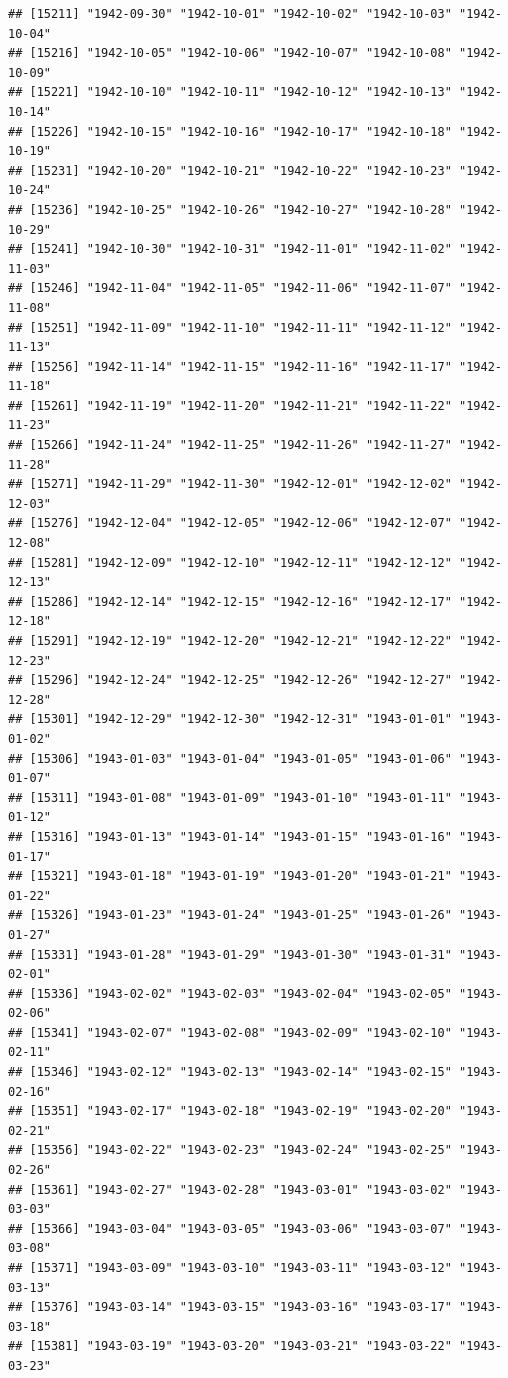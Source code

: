 \documentclass{article}\usepackage[]{graphicx}\usepackage[]{color}
\makeatletter
\newenvironment{kframe}{%
 \def\at@end@of@kframe{}%
 \ifinner\ifhmode%
  \def\at@end@of@kframe{\end{minipage}}%
  \begin{minipage}{\columnwidth}%
 \fi\fi%
 \def\FrameCommand##1{\hskip\@totalleftmargin \hskip-\fboxsep
 \colorbox{shadecolor}{##1}\hskip-\fboxsep
     \hskip-\linewidth \hskip-\@totalleftmargin \hskip\columnwidth}%
 \MakeFramed {\advance\hsize-\width
   \@totalleftmargin\z@ \linewidth\hsize
   \@setminipage}}%
 {\par\unskip\endMakeFramed%
 \at@end@of@kframe}
\newenvironment{knitrout}{}{} %
\makeatother
\begin{document}
\begin{description}
\begin{knitrout}
\begin{kframe}
\begin{verbatim}
## [15211] "1942-09-30" "1942-10-01" "1942-10-02" "1942-10-03" "1942-10-04"
## [15216] "1942-10-05" "1942-10-06" "1942-10-07" "1942-10-08" "1942-10-09"
## [15221] "1942-10-10" "1942-10-11" "1942-10-12" "1942-10-13" "1942-10-14"
## [15226] "1942-10-15" "1942-10-16" "1942-10-17" "1942-10-18" "1942-10-19"
## [15231] "1942-10-20" "1942-10-21" "1942-10-22" "1942-10-23" "1942-10-24"
## [15236] "1942-10-25" "1942-10-26" "1942-10-27" "1942-10-28" "1942-10-29"
## [15241] "1942-10-30" "1942-10-31" "1942-11-01" "1942-11-02" "1942-11-03"
## [15246] "1942-11-04" "1942-11-05" "1942-11-06" "1942-11-07" "1942-11-08"
## [15251] "1942-11-09" "1942-11-10" "1942-11-11" "1942-11-12" "1942-11-13"
## [15256] "1942-11-14" "1942-11-15" "1942-11-16" "1942-11-17" "1942-11-18"
## [15261] "1942-11-19" "1942-11-20" "1942-11-21" "1942-11-22" "1942-11-23"
## [15266] "1942-11-24" "1942-11-25" "1942-11-26" "1942-11-27" "1942-11-28"
## [15271] "1942-11-29" "1942-11-30" "1942-12-01" "1942-12-02" "1942-12-03"
## [15276] "1942-12-04" "1942-12-05" "1942-12-06" "1942-12-07" "1942-12-08"
## [15281] "1942-12-09" "1942-12-10" "1942-12-11" "1942-12-12" "1942-12-13"
## [15286] "1942-12-14" "1942-12-15" "1942-12-16" "1942-12-17" "1942-12-18"
## [15291] "1942-12-19" "1942-12-20" "1942-12-21" "1942-12-22" "1942-12-23"
## [15296] "1942-12-24" "1942-12-25" "1942-12-26" "1942-12-27" "1942-12-28"
## [15301] "1942-12-29" "1942-12-30" "1942-12-31" "1943-01-01" "1943-01-02"
## [15306] "1943-01-03" "1943-01-04" "1943-01-05" "1943-01-06" "1943-01-07"
## [15311] "1943-01-08" "1943-01-09" "1943-01-10" "1943-01-11" "1943-01-12"
## [15316] "1943-01-13" "1943-01-14" "1943-01-15" "1943-01-16" "1943-01-17"
## [15321] "1943-01-18" "1943-01-19" "1943-01-20" "1943-01-21" "1943-01-22"
## [15326] "1943-01-23" "1943-01-24" "1943-01-25" "1943-01-26" "1943-01-27"
## [15331] "1943-01-28" "1943-01-29" "1943-01-30" "1943-01-31" "1943-02-01"
## [15336] "1943-02-02" "1943-02-03" "1943-02-04" "1943-02-05" "1943-02-06"
## [15341] "1943-02-07" "1943-02-08" "1943-02-09" "1943-02-10" "1943-02-11"
## [15346] "1943-02-12" "1943-02-13" "1943-02-14" "1943-02-15" "1943-02-16"
## [15351] "1943-02-17" "1943-02-18" "1943-02-19" "1943-02-20" "1943-02-21"
## [15356] "1943-02-22" "1943-02-23" "1943-02-24" "1943-02-25" "1943-02-26"
## [15361] "1943-02-27" "1943-02-28" "1943-03-01" "1943-03-02" "1943-03-03"
## [15366] "1943-03-04" "1943-03-05" "1943-03-06" "1943-03-07" "1943-03-08"
## [15371] "1943-03-09" "1943-03-10" "1943-03-11" "1943-03-12" "1943-03-13"
## [15376] "1943-03-14" "1943-03-15" "1943-03-16" "1943-03-17" "1943-03-18"
## [15381] "1943-03-19" "1943-03-20" "1943-03-21" "1943-03-22" "1943-03-23"

\end{verbatim}
\end{kframe}
\end{knitrout}
\end{description}
\end{document}
